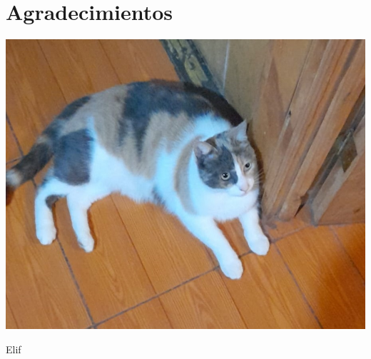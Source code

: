 \documentclass{report}
\begin{document}

\chapter*{Agradecimientos}
\begin{center}
	\includegraphics{elif.jpeg}
	
	Elif
\end{center}

\tableofcontents
\listoffigures



\printbibliography
\end{document}
